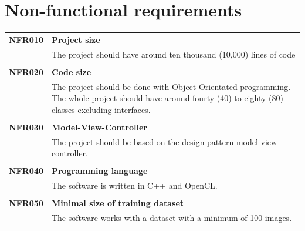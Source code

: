 \documentclass[parskip=full]{scrartcl}
\begin{document}
\newpage

\section{Non-functional requirements}
\begin{tabular}{p{2cm}p{11.4cm}}
\textbf{NFR010} & \textbf{Project size}\\
& The project should have around ten thousand (10,000) lines of code \\
& \\
\textbf{NFR020} & \textbf{Code size}\\
& The project should be done with Object-Orientated programming. The whole project should have around fourty (40) to eighty (80) classes excluding interfaces. \\
& \\
\textbf{NFR030} & \textbf{Model-View-Controller}\\
& The project should be based on the design pattern model-view-controller. \\
& \\
\textbf{NFR040} & \textbf{Programming language}\\
& The software is written in C++ and OpenCL.\\
& \\
\textbf{NFR050} & \textbf{Minimal size of training dataset}\\
& The software works with a dataset with a minimum of 100 images.
\end{tabular}

\newpage
\end{document}
